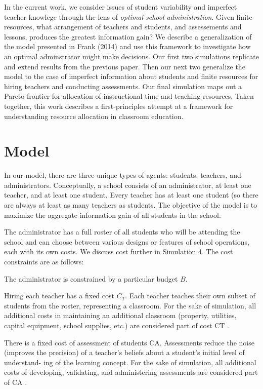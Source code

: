 \documentclass[10pt, letterpaper]{article}
\begin{document}
In the current work, we consider issues of student variability and
imperfect teacher knowlege through the lens of \emph{optimal school
administration}. Given finite resources, what arrangement of teachers
and students, and assessements and lessons, produces the greatest
information gain? We describe a generalization of the model presented in
Frank (2014) and use this framework to investigate how an optimal
adminstrator might make decisions. Our first two simulations replicate
and extend results from the previous paper. Then our next two generalize
the model to the case of imperfect information about students and finite
resources for hiring teachers and conducting assessments. Our final
simulation maps out a Pareto frontier for allocation of instructional
time and teaching resources. Taken together, this work describes a
first-principles attempt at a framework for understanding resource
allocation in classroom education.

\section{Model}\label{model}

In our model, there are three unique types of agents: students,
teachers, and administrators. Conceptually, a school consists of an
administrator, at least one teacher, and at least one student. Every
teacher has at least one student (so there are always at least as many
teachers as students. The objective of the model is to maximize the
aggregate information gain of all students in the school.

The administrator has a full roster of all students who will be
attending the school and can choose between various designs or features
of school operations, each with its own costs. We discuss cost further
in Simulation 4. The cost constraints are as follows:

The administrator is constrained by a particular budget \(B\).

Hiring each teacher has a fixed cost \(C_T\). Each teacher teaches their
own subset of students from the roster, representing a classroom. For
the sake of simulation, all additional costs in maintaining an
additional classroom (property, utilities, capital equipment, school
supplies, etc.) are considered part of cost CT .

There is a fixed cost of assessment of students CA. Assessments reduce
the noise (improves the precision) of a teacher's beliefs about a
student's initial level of understand- ing of the learning concept. For
the sake of simulation, all additional costs of developing, validating,
and administering assessments are considered part of CA .
\end{document}
